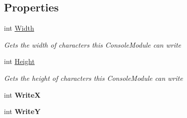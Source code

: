 \subsection*{Properties}
\begin{DoxyCompactItemize}
\item 
\hypertarget{class_m_b_c_1_1_terminal_1_1_terminal_module_a5ba026031ce8f6890e1cb8b045472bf6}{int \hyperlink{class_m_b_c_1_1_terminal_1_1_terminal_module_a5ba026031ce8f6890e1cb8b045472bf6}{Width}}\label{class_m_b_c_1_1_terminal_1_1_terminal_module_a5ba026031ce8f6890e1cb8b045472bf6}

\begin{DoxyCompactList}\small\item\em Gets the width of characters this Console\-Module can write\end{DoxyCompactList}\item 
\hypertarget{class_m_b_c_1_1_terminal_1_1_terminal_module_a7d911bbfcfad5228e2d4a67ae26474f7}{int \hyperlink{class_m_b_c_1_1_terminal_1_1_terminal_module_a7d911bbfcfad5228e2d4a67ae26474f7}{Height}}\label{class_m_b_c_1_1_terminal_1_1_terminal_module_a7d911bbfcfad5228e2d4a67ae26474f7}

\begin{DoxyCompactList}\small\item\em Gets the height of characters this Console\-Module can write\end{DoxyCompactList}\item 
\hypertarget{class_m_b_c_1_1_terminal_1_1_terminal_module_ad9e69e633d64e7366db31f67485c3e09}{int {\bfseries Write\-X}}\label{class_m_b_c_1_1_terminal_1_1_terminal_module_ad9e69e633d64e7366db31f67485c3e09}

\item 
\hypertarget{class_m_b_c_1_1_terminal_1_1_terminal_module_a7acea15aab965deced594b2f0e896d43}{int {\bfseries Write\-Y}}\label{class_m_b_c_1_1_terminal_1_1_terminal_module_a7acea15aab965deced594b2f0e896d43}

\end{DoxyCompactItemize}
